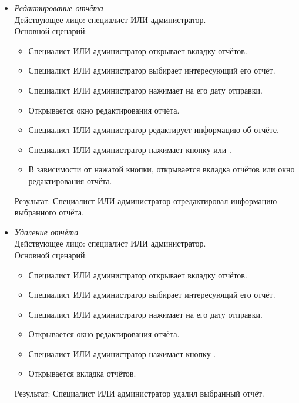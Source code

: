 \begin{itemize}[topsep=0pt, parsep=0pt, itemsep=0pt, leftmargin=*, labelindent=0.5cm]
	\item \textit{Редактирование отчёта} \\
	Действующее лицо: специалист ИЛИ администратор. \\
	Основной сценарий:
	\begin{itemize}[topsep=0pt, parsep=0pt, itemsep=0pt, leftmargin=*, labelindent=0.5cm]
		\item Специалист ИЛИ администратор открывает вкладку отчётов.
		\item Специалист ИЛИ администратор выбирает интересующий его отчёт.
		\item Специалист ИЛИ администратор нажимает на его дату отправки.
		\item Открывается окно редактирования отчёта.
		\item Специалист ИЛИ администратор редактирует информацию об отчёте.
		\item Специалист ИЛИ администратор нажимает кнопку  или .
		\item В зависимости от нажатой кнопки, открывается вкладка отчётов или окно редактирования отчёта.
	\end{itemize}
	Результат: Специалист ИЛИ администратор отредактировал информацию выбранного отчёта.
\end{itemize}

\begin{itemize}[topsep=0pt, parsep=0pt, itemsep=0pt, leftmargin=*, labelindent=0.5cm]
	\item \textit{Удаление отчёта} \\
	Действующее лицо: специалист ИЛИ администратор. \\
	Основной сценарий:
	\begin{itemize}[topsep=0pt, parsep=0pt, itemsep=0pt, leftmargin=*, labelindent=0.5cm]
		\item Специалист ИЛИ администратор открывает вкладку отчётов.
		\item Специалист ИЛИ администратор выбирает интересующий его отчёт.
		\item Специалист ИЛИ администратор нажимает на его дату отправки.
		\item Открывается окно редактирования отчёта.
		\item Специалист ИЛИ администратор нажимает кнопку .
		\item Открывается вкладка отчётов.
	\end{itemize}
	Результат: Специалист ИЛИ администратор удалил выбранный отчёт.
\end{itemize}

